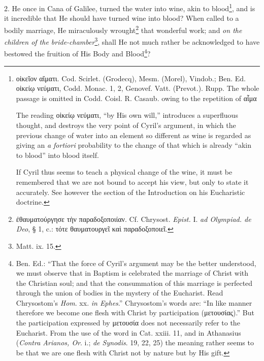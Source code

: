 2. He once in Cana of Galilee, turned the water into wine, akin to blood\footnote{\textgreek{οἰκεῖον αἵματι}. Cod. Scirlet. (Grodecq), Mesm. (Morel), Vindob.; Ben. Ed. \textgreek{οἰκείῳ νεύματι}, Codd. Monac. 1, 2, Genovef. Vatt. (Prevot.). Rupp. The whole passage is omitted in Codd. Coisl. R. Casaub. owing to the repetition of \textgreek{αἷμα} \par The reading \textgreek{οἰκείῳ νεύματι}, “by His own will,” introduces a superfluous thought, and destroys the very point of Cyril’s argument, in which the previous change of water into an element so different as wine is regarded as giving an \emph{a fortiori} probability to the change of that which is already “akin to blood” into blood itself. \par If Cyril thus seems to teach a physical change of the wine, it must be remembered that we are not bound to accept his view, but only to state it accurately. See however the section of the Introduction on his Eucharistic doctrine.}, and is it incredible that He should have turned wine into blood? When called to a bodily marriage, He miraculously wrought\footnote{\textgreek{ἐθαυματούργησε τὴν παραδοξοποιίαν}. Cf. Chrysost. \emph{Epist.} I. \emph{ad Olympiad. de Deo}, § 1, c.: \textgreek{τότε θαυματουργεῖ καὶ παραδοξοποιεῖ}.} that wonderful work; and \emph{on the children of the bride-chamber}\footnote{Matt. ix. 15.}, shall He not much rather be acknowledged to have bestowed the fruition of His Body and Blood\footnote{Ben. Ed.: “That the force of Cyril’s argument may be the better understood, we must observe that in Baptism is celebrated the marriage of Christ with the Christian soul; and that the consummation of this marriage is perfected through the union of bodies in the mystery of the Eucharist. Read Chrysostom’s \emph{Hom}. xx. \emph{in Ephes}.” Chrysostom’s words are: “In like manner therefore we become one flesh with Christ by participation (\textgreek{μετουσίας}).” But the participation expressed by \textgreek{μετουσία} does not necessarily refer to the Eucharist. From the use of the word in Cat. xxiii. 11, and in Athanasius (\emph{Contra Arianos, Or}. i.; \emph{de Synodis}. 19, 22, 25) the meaning rather seems to be that we are one flesh with Christ not by nature but by His gift.}?

